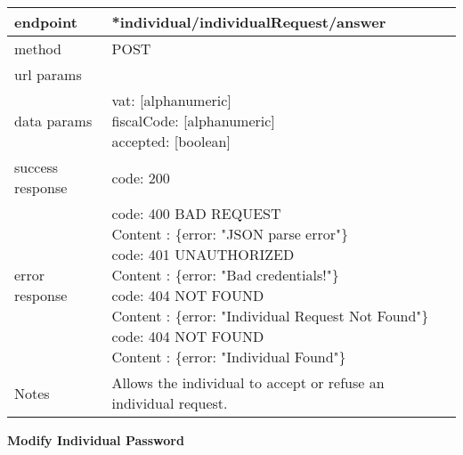 	\begin{tabularx}{\linewidth}{| l| l }
		\hline
		endpoint & *individual/individualRequest/answer \\
		\hline
		method & POST \\
		\hline
		url params & \\
		\hline
		data params &
		\parbox{0.7\textwidth}{
			\bigskip
			vat: [alphanumeric]\\
			fiscalCode: [alphanumeric]\\
			accepted: [boolean]
			\bigskip
		} \\
		\hline
		success response &
		\parbox{0.7\textwidth}{
			\bigskip
			code: 200
			\bigskip
		} \\
		\hline
		error response &
		\parbox{0.7\textwidth}{
			\bigskip
			code: 400 BAD REQUEST \\
			Content : \{error: "JSON parse error"\}\\
			code: 401 UNAUTHORIZED \\
			Content : \{error: "Bad credentials!"\}\\
			code: 404 NOT FOUND \\
			Content : \{error: "Individual Request Not Found"\}\\
			code: 404 NOT FOUND \\
			Content : \{error: "Individual Found"\}
			\bigskip
		} \\
		\hline
		Notes & 
		\parbox{0.7\textwidth}{
			\bigskip Allows the individual to accept or refuse an individual request.
		\bigskip}  \\
		\hline
	\end{tabularx}
	
	\textbf{Modify Individual Password}\\

